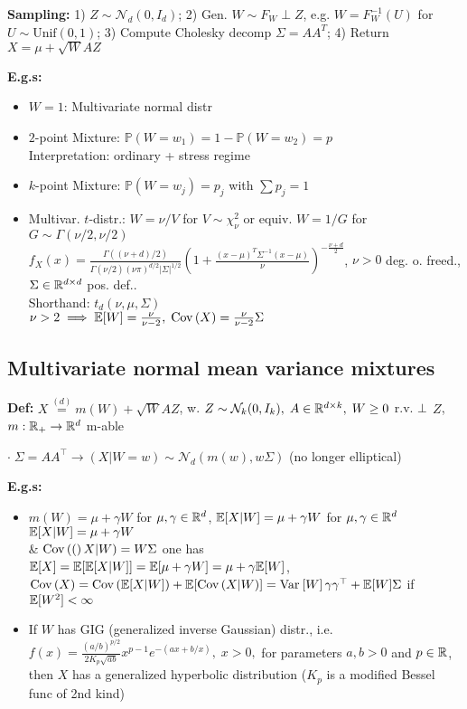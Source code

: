 \textbf{Sampling:} 1) $Z\sim\mathcal{N}_d(0,I_d)$; 2) Gen. $W\sim F_W\perp Z$, e.g. $W=F^{-1}_W(U)$ for $U\sim\text{Unif}(0,1)$; 3) Compute Cholesky decomp $\Sigma=AA^T$;
4) Return $X=\mu + \sqrt W A Z$

\textbf{E.g.s:}
\begin{itemize}
    \item $W=1$: Multivariate normal distr
    \item $2$-point Mixture: $\mathbb{P}(W=w_1)=1-\mathbb{P}(W=w_2)=p$\\
    Interpretation: ordinary + stress regime
    \item $k$-point Mixture: $\mathbb{P}(W=w_j)=p_j$ with $\sum p_j=1$
    \item Multivar. $t$-distr.: $W=\nu/V$ for $V\sim \chi^2_\nu$ or equiv. $W=1/G$ for $G\sim \Gamma(\nu/2,\nu/2)$\\
    $f_X(x)=\frac{\Gamma((\nu + d)/2)}{\Gamma(\nu/2)(\nu\pi)^{d/2}|\Sigma|^{1/2}}(1+\frac{(x-\mu)^T\Sigma^{-1}(x-\mu)}{\nu})^{-\frac{\nu+d}{2}}$, $\nu>0$ deg. o. freed., $\Sigma\in\mathbb{R}^{d\times d}$ pos. def..\\
    Shorthand: $t_d(\nu,\mu,\Sigma)$\\
    $\nu>2\implies \mathbb{E}[W]=\frac{\nu}{\nu-2},\; \operatorname{Cov}\left(X \right) = \frac{\nu}{\nu-2}\Sigma$
\end{itemize}

\subsection*{Multivariate normal mean variance mixtures}
\textbf{Def:} $X\stackrel{(d)}{=}m(W)+\sqrt W A Z$, w. $Z\sim \mathcal{N}_k(0,I_k),\; A\in\mathbb{R}^{d\times k},\; W\geq 0$ r.v. $\perp$ $Z$, $m:\mathbb{R}_+\rightarrow \mathbb{R}^d$ m-able

$\cdot\; \Sigma=AA^\top \rightarrow (X|W=w)\sim \mathcal{N}_d(m(w),w\Sigma)$ (no longer elliptical)

\textbf{E.g.s:}
\begin{itemize}
    \item $m(W)=\mu + \gamma W$ for $\mu,\gamma\in\mathbb{R}^d$, $\mathbb{E}[X|W]=\mu+\gamma W$ for $\mu, \gamma \in \mathbb{R}^d$
    $\mathbb{E}[X|W]=\mu+\gamma W$\\
    \& $ \operatorname{Cov}\left(( \right)X|W)=W\Sigma$ one has\\ $\mathbb{E}[X]=\mathbb{E}[\mathbb{E}[X|W]]=\mathbb{E}[\mu+\gamma W]=\mu +\gamma \mathbb{E}[W]$,\\
    $\operatorname{Cov}\left(X \right) = \operatorname{Cov}\left(\mathbb{E}[X|W] \right)+\mathbb{E}[\operatorname{Cov}\left(X|W \right)]=\operatorname{Var}_{}\left[ W \right] \gamma\gamma^\top + \mathbb{E}[W]\Sigma$ if $\mathbb{E}[W^2]<\infty$
    \item If $W$ has GIG (generalized inverse Gaussian) distr., i.e.
    $f(x)=\frac{(a/b)^{p/2}}{2K_p\sqrt{ab}}x^{p-1}e^{-(ax+b/x)},\; x>0,$ for parameters $a,b>0$ and $p\in\mathbb{R}$, then $X$ has a generalized hyperbolic distribution ($K_p$ is a modified Bessel func of 2nd kind) 
\end{itemize}

